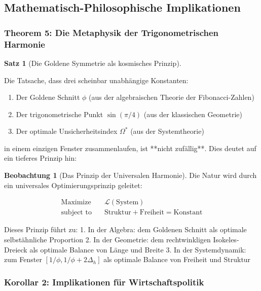 \documentclass[a4paper, 12pt, twoside, openright]{report}
\theoremstyle{definition}
\newtheorem{beobachtung}{Beobachtung}
\theoremstyle{definition}
\newtheorem{satz}{Satz}[chapter]
\begin{document}
\subsection{Mathematisch-Philosophische Implikationen}

\subsubsection*{Theorem 5: Die Metaphysik der Trigonometrischen Harmonie}

\begin{satz}[Die Goldene Symmetrie als kosmisches Prinzip]
\label{satz:cosmic_harmony}

Die Tatsache, dass drei scheinbar unabhängige Konstanten:

\begin{enumerate}
	\item Der Goldene Schnitt $\phi$ (aus der algebraischen Theorie der Fibonacci-Zahlen)
	\item Der trigonometrische Punkt $\sin(\pi/4)$ (aus der klassischen Geometrie)
	\item Der optimale Unsicherheitsindex $\Omega^*$ (aus der Systemtheorie)
\end{enumerate}

in einem einzigen Fenster zusammenlaufen, ist **nicht zufällig**. Dies deutet auf ein tieferes Prinzip hin:

\begin{beobachtung}[Das Prinzip der Universalen Harmonie]

Die Natur wird durch ein universales Optimierungsprinzip geleitet:

\begin{align}
\text{Maximize} \quad & \mathcal{L}(\text{System}) \\
\text{subject to} \quad & \text{Struktur} + \text{Freiheit} = \text{Konstant}
\end{align}

Dieses Prinzip führt zu:
1. In der Algebra: dem Goldenen Schnitt als optimale selbstähnliche Proportion
2. In der Geometrie: dem rechtwinkligen Isokeles-Dreieck als optimale Balance von Länge und Breite
3. In der Systemdynamik: zum Fenster $[1/\phi, 1/\phi + 2\Delta_h]$ als optimale Balance von Freiheit und Struktur

\end{beobachtung}

\end{satz}

\subsubsection{Korollar 2: Implikationen für Wirtschaftspolitik}
\end{document}
